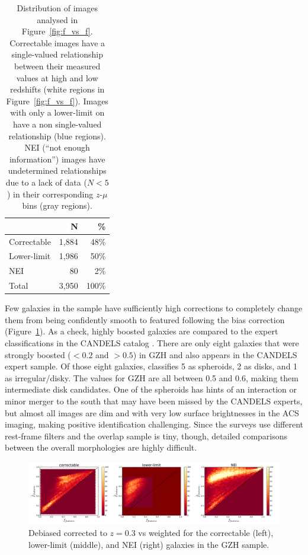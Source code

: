 \documentclass[twocolumn]{aastex6}
\begin{document}
\begin{table}
\center
\caption{Distribution of \ferengi{} images analysed in Figure~\ref{fig:f_vs_f}. Correctable images have a single-valued relationship between their measured \ffeatures{} values at high and low redshifts (white regions in Figure~\ref{fig:f_vs_f}). Images with only a lower-limit on \ffeatures{} have a non single-valued relationship (blue regions). NEI (``not enough information'') images have undetermined relationships due to a lack of data ($N<5$) in their corresponding $z$-$\mu$ bins (gray regions).\label{tbl:ferengi_corrections}}
\begin{tabular}{lrr}
\hline \hline
				                   & N       & \% \\
\hline 
Correctable                        & 1,884   & 48\% \\
Lower-limit                        & 1,986   & 50\% \\
NEI                                & 80      &  2\%\\
Total                              & 3,950   & 100\% \\
\hline \hline
\end{tabular}
\end{table}

Few galaxies in the sample have sufficiently high corrections to completely change them from being confidently smooth to featured following the bias correction (Figure~\ref{fig:debiased_corrections}). As a check, highly boosted galaxies are compared to the expert classifications in the CANDELS catalog \citep{kar15}. There are only eight galaxies that were strongly boosted (\ffeatures$<0.2$ and \fbest$>0.5$) in GZH and also appears in the CANDELS expert sample. Of those eight galaxies, \citet{kar15} classifies 5 as spheroids, 2 as disks, and 1 as irregular/disky. The \fbest{} values for GZH are all between 0.5 and 0.6, making them intermediate disk candidates. One of the spheroids has hints of an interaction or minor merger to the south that may have been missed by the CANDELS experts, but almost all images are dim and with very low surface brightnesses in the ACS imaging, making positive identification challenging. Since the surveys use different rest-frame filters and the overlap sample is tiny, though, detailed comparisons between the overall morphologies are highly difficult.

\begin{figure}
\center
\includegraphics[width=\textwidth]{figures/debiased_corrections.pdf}
\caption{Debiased \ffeatures{} corrected to $z=0.3$ vs weighted \ffeatures{} for the correctable (left), lower-limit (middle), and NEI (right) galaxies in the GZH sample.}
\label{fig:debiased_corrections}
\end{figure}
\end{document}
